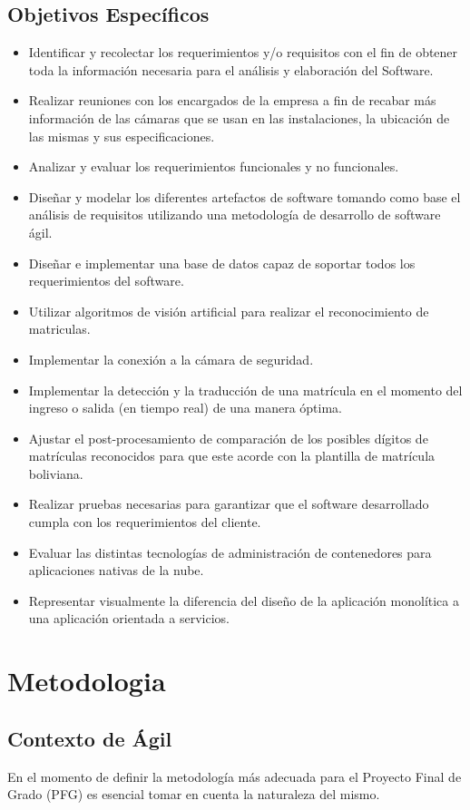     \subsection{Objetivos Específicos}
    \begin{itemize}
    \item Identificar y recolectar los requerimientos y/o requisitos con el fin de obtener toda la información necesaria para el análisis y elaboración del Software.
    \item Realizar reuniones con los encargados de la empresa a fin de recabar más información de las cámaras que se usan en las instalaciones, la ubicación de las mismas y sus especificaciones.
    \item Analizar y evaluar los requerimientos funcionales y no funcionales.
    \item Diseñar y modelar los diferentes artefactos de software tomando como base el análisis de requisitos utilizando una metodología de desarrollo de software ágil.
    \item Diseñar e implementar una base de datos capaz de soportar todos los requerimientos del software.
    \item Utilizar algoritmos de visión artificial para realizar el reconocimiento de matriculas.
    \item Implementar la conexión a la cámara de seguridad.
    \item Implementar la detección y la traducción de una matrícula en el momento del ingreso o salida (en tiempo real) de una manera óptima.
    \item Ajustar el post-procesamiento de comparación de los posibles dígitos de matrículas reconocidos para que este acorde con la plantilla de matrícula boliviana.
    \item Realizar pruebas necesarias para garantizar que el software desarrollado cumpla con los requerimientos del cliente.
    \item Evaluar las distintas tecnologías de administración de contenedores para aplicaciones nativas de la nube. 
    \item Representar visualmente la diferencia del diseño de la aplicación monolítica a una aplicación orientada a servicios.
    

    \end{itemize}
\section{Metodologia}
\subsection{Contexto de Ágil}
En el momento de definir la metodología más adecuada para el Proyecto Final de Grado (PFG) es esencial tomar en cuenta la naturaleza del mismo.


